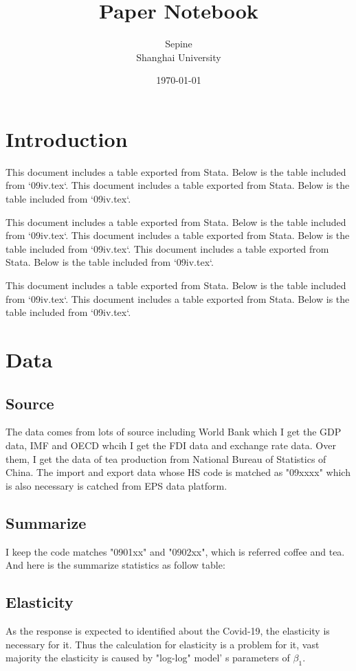 \documentclass[12pt]{article}
\title{Paper Notebook}
\author{Sepine \\ Shanghai University}
\date{\today}
\begin{document}
\maketitle %

\section{Introduction}
This document includes a table exported from Stata. Below is the table included from `09iv.tex`.
This document includes a table exported from Stata. Below is the table included from `09iv.tex`.

This document includes a table exported from Stata. Below is the table included from `09iv.tex`.
This document includes a table exported from Stata. Below is the table included from `09iv.tex`.
This document includes a table exported from Stata. Below is the table included from `09iv.tex`.

This document includes a table exported from Stata. Below is the table included from `09iv.tex`.
This document includes a table exported from Stata. Below is the table included from `09iv.tex`.

\section{Data}
\subsection{Source}
The data comes from lots of source including World Bank which I get the GDP data, IMF and OECD whcih I get the FDI data and exchange rate data.
Over them, I get the data of tea production from National Bureau of Statistics of China.
The import and export data whose HS code is matched as "09xxxx" which is also necessary is catched from EPS data platform.
\subsection{Summarize}
I keep the code matches "0901xx" and "0902xx", which is referred coffee and tea.
And here is the summarize statistics as follow table:

% 



\subsection{Elasticity}
As the response is expected to identified about the Covid-19, the elasticity is necessary for it.
Thus the calculation for elasticity is a problem for it, vast majority the elasticity is caused by "log-log" model' s parameters of $\beta_1$.
\end{document}
